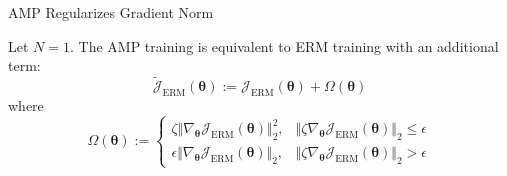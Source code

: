 \begin{frame}{AMP Regularizes Gradient Norm}

\begin{theorem}
Let $N=1$. The AMP training is equivalent to ERM training with an additional term:
\begin{equation*}
\widetilde{\mathcal{J}}_\mathrm{ERM}(\boldsymbol{\theta}):=\mathcal{J}_\mathrm{ERM}(\boldsymbol{\theta})+\Omega(\boldsymbol{\theta})
\end{equation*}
where
\begin{equation*}
\Omega(\boldsymbol{\theta}):=\begin{cases}
\zeta\Vert\nabla_{\boldsymbol{\theta}}\mathcal{J}_\mathrm{ERM}(\boldsymbol{\theta})\Vert_2^2,&\Vert\zeta\nabla_{\boldsymbol{\theta}}\mathcal{J}_\mathrm{ERM}(\boldsymbol{\theta})\Vert_2\le\epsilon\\
\epsilon\Vert\nabla_{\boldsymbol{\theta}}\mathcal{J}_\mathrm{ERM}(\boldsymbol{\theta})\Vert_2,&\Vert\zeta\nabla_{\boldsymbol{\theta}}\mathcal{J}_\mathrm{ERM}(\boldsymbol{\theta})\Vert_2>\epsilon
\end{cases}
\end{equation*}
\end{theorem}


\end{frame}

